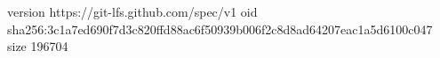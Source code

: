 version https://git-lfs.github.com/spec/v1
oid sha256:3c1a7ed690f7d3c820ffd88ac6f50939b006f2c8d8ad64207eac1a5d6100c047
size 196704
